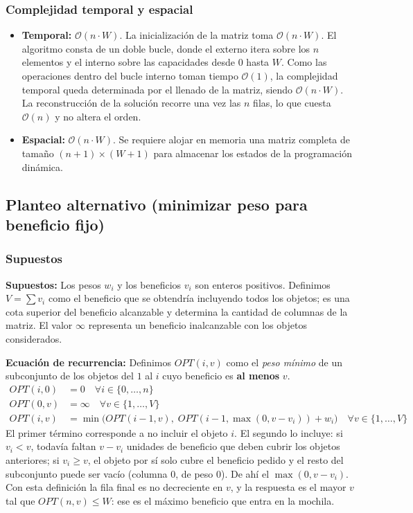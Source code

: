 \documentclass[11pt,a4paper]{article}
\begin{document}
\subsubsection{Complejidad temporal y espacial}
\begin{itemize}
    \item \textbf{Temporal:} $\mathcal{O}(n \cdot W)$. La inicialización de la matriz toma $\mathcal{O}(n \cdot W)$. El algoritmo consta de un doble bucle, donde el externo itera sobre los $n$ elementos y el interno sobre las capacidades desde $0$ hasta $W$. Como las operaciones dentro del bucle interno toman tiempo $\mathcal{O}(1)$, la complejidad temporal queda determinada por el llenado de la matriz, siendo $\mathcal{O}(n \cdot W)$. La reconstrucción de la solución recorre una vez las $n$ filas, lo que cuesta $\mathcal{O}(n)$ y no altera el orden.
    \item \textbf{Espacial:} $\mathcal{O}(n \cdot W)$. Se requiere alojar en memoria una matriz completa de tamaño $(n+1) \times (W+1)$ para almacenar los estados de la programación dinámica.
\end{itemize}

\bigskip

\subsection{Planteo alternativo (minimizar peso para beneficio fijo)}

\subsubsection{Supuestos}
\textbf{Supuestos:} Los pesos $w_i$ y los beneficios $v_i$ son enteros positivos. Definimos $V = \sum v_i$ como el beneficio que se obtendría incluyendo todos los objetos; es una cota superior del beneficio alcanzable y determina la cantidad de columnas de la matriz. El valor $\infty$ representa un beneficio inalcanzable con los objetos considerados.

\textbf{Ecuación de recurrencia:} Definimos $OPT(i, v)$ como el \textit{peso mínimo} de un subconjunto de los objetos del $1$ al $i$ cuyo beneficio es \textbf{al menos} $v$.
\begin{align*}
    OPT(i, 0) &= 0 \quad \forall i \in \{0, \dots, n\} \\
    OPT(0, v) &= \infty \quad \forall v \in \{1, \dots, V\} \\
    OPT(i, v) &= \min\big(OPT(i-1, v),\; OPT(i-1, \max(0, v - v_i)) + w_i\big) \quad \forall v \in \{1, \dots, V\}
\end{align*}
El primer término corresponde a no incluir el objeto $i$. El segundo lo incluye: si $v_i < v$, todavía faltan $v - v_i$ unidades de beneficio que deben cubrir los objetos anteriores; si $v_i \ge v$, el objeto por sí solo cubre el beneficio pedido y el resto del subconjunto puede ser vacío (columna $0$, de peso $0$). De ahí el $\max(0, v - v_i)$. Con esta definición la fila final es no decreciente en $v$, y la respuesta es el mayor $v$ tal que $OPT(n, v) \le W$: ese es el máximo beneficio que entra en la mochila.
\end{document}
